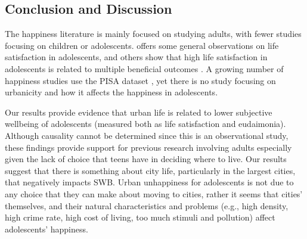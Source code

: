 \documentclass[10pt, letterpaper]{article}
\begin{document}
\begin{spacing}{1.4}
\section*{Conclusion and Discussion}

The happiness literature is mainly focused on studying adults, with fewer studies focusing on children or adolescents. \citet{huebner2004research} offers some general observations on life
satisfaction in adolescents, and  others show that high life satisfaction in
adolescents is related to multiple beneficial outcomes
\citep{proctor2010very,suldo2006extremely}.
 A growing number of happiness studies use the PISA dataset \citep[][]{tang2019immigration,rudolf2020life,chung2021exploring,pan2023using,marquez24}, yet there is no study focusing on urbanicity and how it affects the happiness in adolescents. 

Our results provide  evidence that urban life is related to lower subjective
wellbeing of adolescents (measured both as life satisfaction and
eudaimonia). Although causality cannot be determined since this is an
observational study, these findings provide  support for previous research
involving adults %
 especially given the lack of choice that teens have in deciding where to
 live. Our results suggest that there is something about city life, particularly
 in the largest cities,  that negatively impacts SWB. Urban unhappiness for
 adolescents is not due to any choice that they can make about moving to cities,
 rather it seems that cities' themselves, and their natural characteristics and
 problems (e.g., high density, high crime rate, high cost of living, too much
 stimuli and pollution)  affect adolescents' happiness.
 

\end{spacing}
\end{document}
